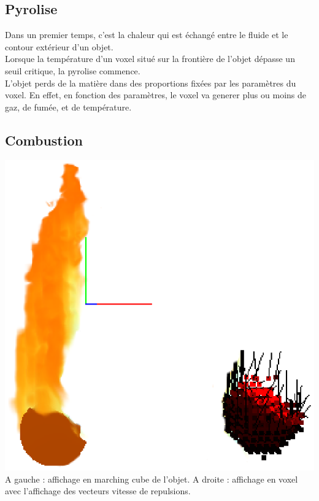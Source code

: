 \documentclass[a4paper,10pt]{article}
\begin{document}
\subsection{Pyrolise}

Dans un premier temps, c'est la chaleur qui est échangé entre le fluide et le contour
extérieur d'un objet.\\
Lorsque la température d'un voxel situé sur la frontière de l'objet dépasse un seuil critique, la pyrolise commence. \\
L'objet perds de la matière dans des proportions fixées par les paramètres du voxel.
En effet, en fonction des paramètres, le voxel va generer plus ou moins de gaz, de fumée, et de température.

\subsection{Combustion}

    \begin{center}
	\includegraphics[scale=1]{Decomposition.ps}\\
	A gauche : affichage en marching cube de l'objet. A droite : affichage en voxel avec l'affichage des vecteurs vitesse de repulsions.\\
    \end{center}
    
\end{document}

